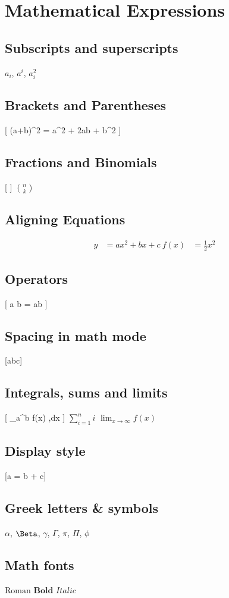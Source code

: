 \documentclass{article}
\begin{document}
\section{Mathematical Expressions}

\subsection{Subscripts and superscripts}
$a_i$, $a^i$, $a_i^2$

\subsection{Brackets and Parentheses}
[ (a+b)^2 = a^2 + 2ab + b^2 ]

\subsection{Fractions and Binomials}
[  ] \qquad $\binom{n}{k}$

\subsection{Aligning Equations}
\begin{align*}
y &= ax^2 + bx + c \
f(x) &= \frac{1}{2}x^2
\end{align*}

\subsection{Operators}
[ a \times b = ab ]

\subsection{Spacing in math mode}
[a\quad b\qquad c]

\subsection{Integrals, sums and limits}
[ \int_a^b f(x) ,dx ] \qquad $\sum_{i=1}^n i$ \qquad $\lim_{x \to \infty} f(x)$

\subsection{Display style}
[a = b + c]

\subsection{Greek letters & symbols}
$\alpha$, $\Beta$, $\gamma$, $\Gamma$, $\pi$, $\Pi$, $\phi$

\subsection{Math fonts}
$\mathrm{Roman}$ \qquad $\mathbf{Bold}$ \qquad $\mathit{Italic}$
\end{document}
